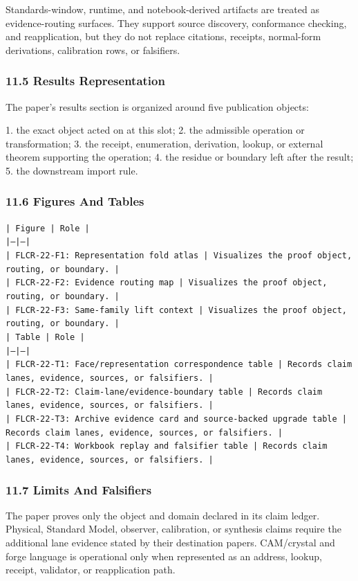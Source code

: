 \documentclass[11pt]{article}
\begin{document}
Standards-window, runtime, and notebook-derived artifacts are treated
as evidence-routing surfaces. They support source discovery, conformance
checking, and reapplication, but they do not replace citations, receipts,
normal-form derivations, calibration rows, or falsifiers.

\subsubsection*{11.5 Results Representation}

The paper's results section is organized around five publication objects:

1. the exact object acted on at this slot;
2. the admissible operation or transformation;
3. the receipt, enumeration, derivation, lookup, or external theorem supporting
   the operation;
4. the residue or boundary left after the result;
5. the downstream import rule.

\subsubsection*{11.6 Figures And Tables}

\noindent\texttt{| Figure | Role |}\\
\noindent\texttt{|---|---|}\\
\noindent\texttt{| FLCR-22-F1: Representation fold atlas | Visualizes the proof object, routing, or boundary. |}\\
\noindent\texttt{| FLCR-22-F2: Evidence routing map | Visualizes the proof object, routing, or boundary. |}\\
\noindent\texttt{| FLCR-22-F3: Same-family lift context | Visualizes the proof object, routing, or boundary. |}\\

\noindent\texttt{| Table | Role |}\\
\noindent\texttt{|---|---|}\\
\noindent\texttt{| FLCR-22-T1: Face/representation correspondence table | Records claim lanes, evidence, sources, or falsifiers. |}\\
\noindent\texttt{| FLCR-22-T2: Claim-lane/evidence-boundary table | Records claim lanes, evidence, sources, or falsifiers. |}\\
\noindent\texttt{| FLCR-22-T3: Archive evidence card and source-backed upgrade table | Records claim lanes, evidence, sources, or falsifiers. |}\\
\noindent\texttt{| FLCR-22-T4: Workbook replay and falsifier table | Records claim lanes, evidence, sources, or falsifiers. |}\\

\subsubsection*{11.7 Limits And Falsifiers}

The paper proves only the object and domain declared in its claim ledger.
Physical, Standard Model, observer, calibration, or synthesis claims require
the additional lane evidence stated by their destination papers. CAM/crystal
and forge language is operational only when represented as an address, lookup,
receipt, validator, or reapplication path.
\end{document}
